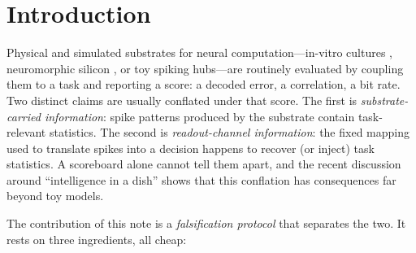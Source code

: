\documentclass[10pt,a4paper]{article}
\begin{document}
\begin{abstract}
only a small amount ($+0.012$, $24/24$ seeds same direction). None of the
substrates shows linearly decodable history in the present-window
population state (Gate E negative), so memory claims are not certified
here. The ranking is not architecture-bound: a second hub
($N=4000$, $p_{\mathrm{re}}=0.02$) reproduces it (LIF $+0.104$ vs.\ IZH
$+0.004$ over the dead null). We conclude: (i) matched dead-substrate
controls for the
\emph{material} of a substrate are cheap, decisive, and should precede
scoreboard comparisons; (ii) readout \emph{robustness} is a stronger
falsification test than a single scoreboard, and we reserve the word
``invariance'' for what our experiments cannot show; and (iii) open-loop
diagnosis cannot certify memory, which must be demonstrated in the closed
loop.
\end{abstract}

\section{Introduction}\label{sec:intro}

Physical and simulated substrates for neural computation---in-vitro
cultures \cite{kagan2022dishbrain}, neuromorphic silicon
\cite{maass1997,lukosevicius2009,wringe2025rc}, or toy spiking
hubs---are routinely evaluated by coupling them to a task and reporting
a score: a decoded error, a correlation, a bit rate. Two distinct claims
are usually conflated under that score. The first is
\emph{substrate-carried information}: spike patterns produced by the
substrate contain task-relevant statistics. The second is
\emph{readout-channel information}: the fixed mapping used to translate
spikes into a decision happens to recover (or inject) task statistics. A
scoreboard alone cannot tell them apart, and the recent discussion
around ``intelligence in a dish''
\cite{kagan2022dishbrain,balci2023neurons,kagan2023semantics,
smirnova2023organoid} shows that this conflation has consequences far
beyond toy models.

The contribution of this note is a \emph{falsification protocol} that
separates the two. It rests on three ingredients, all cheap:
\end{document}
